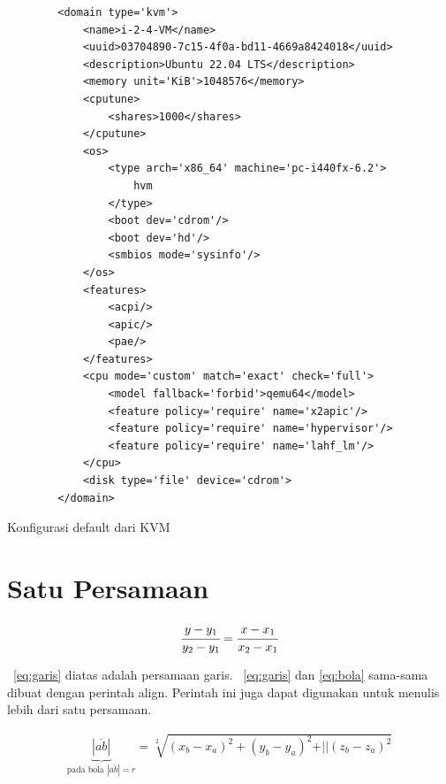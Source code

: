 \begin{listing}[H]
	\begin{verbatim}
		<domain type='kvm'>
			<name>i-2-4-VM</name>
			<uuid>03704890-7c15-4f0a-bd11-4669a8424018</uuid>
			<description>Ubuntu 22.04 LTS</description>
			<memory unit='KiB'>1048576</memory>
			<cputune>
				<shares>1000</shares>
			</cputune>
			<os>
				<type arch='x86_64' machine='pc-i440fx-6.2'>
					hvm
				</type>
				<boot dev='cdrom'/>
				<boot dev='hd'/>
				<smbios mode='sysinfo'/>
			</os>
			<features>
				<acpi/>
				<apic/>
				<pae/>
			</features>
			<cpu mode='custom' match='exact' check='full'>
				<model fallback='forbid'>qemu64</model>
				<feature policy='require' name='x2apic'/>
				<feature policy='require' name='hypervisor'/>
				<feature policy='require' name='lahf_lm'/>
			</cpu>
			<disk type='file' device='cdrom'>
		</domain>
	\end{verbatim}
	\caption{Konfigurasi default dari KVM}
	\label{code:default_kvm_xml}
\end{listing}

\iffalse
\section{Satu Persamaan}

\noindent \begin{align}\label{eq:garis}
	\cfrac{y - y_{1}}{y_{2} - y_{1}} = 
	\cfrac{x - x_{1}}{x_{2} - x_{1}}
\end{align}

\equ~\ref{eq:garis} diatas adalah persamaan garis. 
\equ~\ref{eq:garis} dan \ref{eq:bola} sama-sama dibuat dengan perintah \bslash
align. 
Perintah ini juga dapat digunakan untuk menulis lebih dari satu persamaan. 

\noindent \begin{align}\label{eq:bola}
	\underbrace{|\overline{ab}|}_{\text{pada bola $|\overline{ab}| = r$}} 
		= \sqrt[2]{(x_{b} - x_{a})^{2} + (y_{b} - y_{a})^{2} + 
				\vert\vert(z_{b} - z_{a})^{2}}
\end{align}

